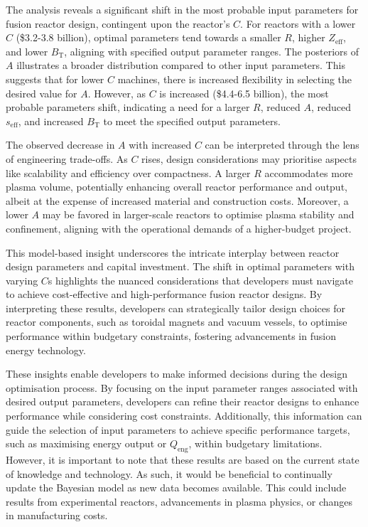 \documentclass[journal]{IEEEtran}
\begin{document}
The analysis reveals a significant shift in the most probable input parameters for fusion reactor design, contingent upon the reactor's $C$. For reactors with a lower $C$ (\$3.2-3.8 billion), optimal parameters tend towards a smaller $R$, higher $Z_{\text{eff}}$, and lower $B_{\text{T}}$, aligning with specified output parameter ranges. The posteriors of $A$ illustrates a broader distribution compared to other input parameters. This suggests that for lower $C$ machines, there is increased flexibility in selecting the desired value for $A$. However, as $C$ is increased (\$4.4-6.5 billion), the most probable parameters shift, indicating a need for a larger $R$, reduced $A$, reduced $s_{\text{eff}}$, and increased $B_{\text{T}}$ to meet the specified output parameters.

The observed decrease in $A$ with increased $C$ can be interpreted through the lens of engineering trade-offs. As $C$ rises, design considerations may prioritise aspects like scalability and efficiency over compactness. A larger $R$ accommodates more plasma volume, potentially enhancing overall reactor performance and output, albeit at the expense of increased material and construction costs. Moreover, a lower $A$ may be favored in larger-scale reactors to optimise plasma stability and confinement, aligning with the operational demands of a higher-budget project. 

This model-based insight underscores the intricate interplay between reactor design parameters and capital investment. The shift in optimal parameters with varying $C$s highlights the nuanced considerations that developers must navigate to achieve cost-effective and high-performance fusion reactor designs. By interpreting these results, developers can strategically tailor design choices for reactor components, such as toroidal magnets and vacuum vessels, to optimise performance within budgetary constraints, fostering advancements in fusion energy technology.

These insights enable developers to make informed decisions during the design optimisation process. By focusing on the input parameter ranges associated with desired output parameters, developers can refine their reactor designs to enhance performance while considering cost constraints. Additionally, this information can guide the selection of input parameters to achieve specific performance targets, such as maximising energy output or $Q_{\text{eng}}$, within budgetary limitations. However, it is important to note that these results are based on the current state of knowledge and technology. As such, it would be beneficial to continually update the Bayesian model as new data becomes available. This could include results from experimental reactors, advancements in plasma physics, or changes in manufacturing costs.
\end{document}
